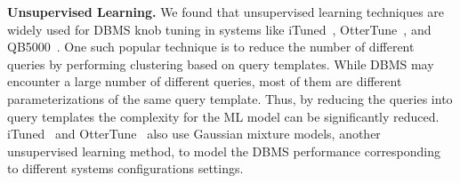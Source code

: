 \vspace{2mm}
\noindent \textbf{Unsupervised Learning.} We found that unsupervised learning techniques are widely used for DBMS knob tuning in systems like iTuned~\cite{ituned}, OtterTune~\cite{ottertune}, and QB5000~\cite{qb5000}.
One such popular technique is to reduce the number of different queries by performing clustering based on query templates.
While DBMS may encounter a large number of different queries, most of them are different parameterizations of the same query template.
Thus, by reducing the queries into query templates the complexity for the ML model can be significantly reduced.
iTuned~\cite{ituned} and OtterTune~\cite{ottertune} also use Gaussian mixture models, another unsupervised learning method, to model the DBMS performance corresponding to different systems configurations settings.
